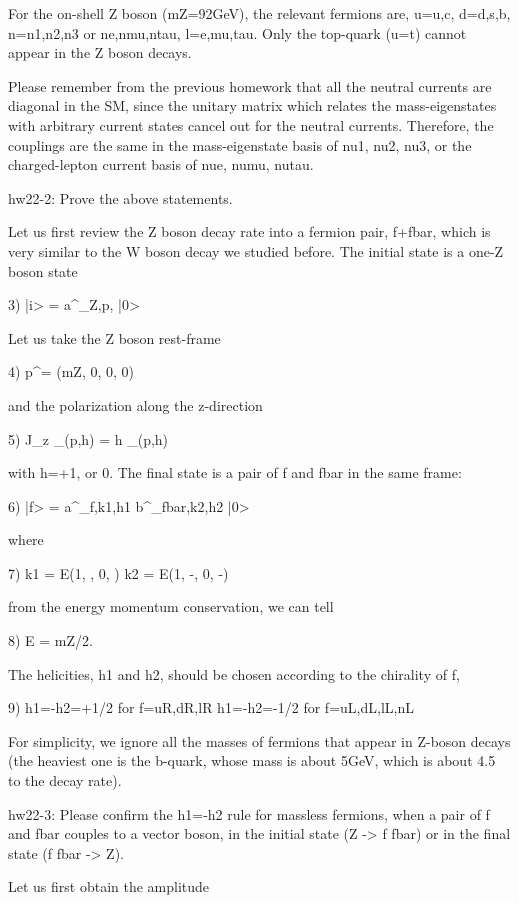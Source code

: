 \documentclass[12pt]{article}
\begin{document}
For the on-shell Z boson (mZ=92GeV), the relevant fermions are,
u=u,c, d=d,s,b, n=n1,n2,n3 or ne,nmu,ntau, l=e,mu,tau.
Only the top-quark (u=t) cannot appear in the Z boson decays.

Please remember from the previous homework that all the neutral
currents are diagonal in the SM, since the unitary matrix which
relates the mass-eigenstates with arbitrary current states
cancel out for the neutral currents.  Therefore, the couplings
are the same in the mass-eigenstate basis of nu1, nu2, nu3,
or the charged-lepton current basis of nue, numu, nutau.

hw22-2: Prove the above statements.

Let us first review the Z boson decay rate into a fermion pair, f+fbar,
which is very similar to the W boson decay we studied before.  The
initial state is a one-Z boson state

3) |i> = a^\dagger_{Z,p,\lambda} |0>

Let us take the Z boson rest-frame

4) p^\mu = (mZ, 0, 0, 0)

and the polarization along the z-direction

5) J_z \epsilon_\mu(p,h) = h \epsilon_\mu(p,h)

with h=+1, or 0.  The final state is a pair of f and fbar in the same
frame:

6) |f> = a^\dagger_{f,k1,h1} b^\dagger_{fbar,k2,h2} |0>

where

7) k1 = E(1,  \sin\theta, 0,  \cos\theta)
   k2 = E(1, -\sin\theta, 0, -\cos\theta)

from the energy momentum conservation, we can tell

8) E = mZ/2.

The helicities, h1 and h2, should be chosen according to the chirality
of f,

9) h1=-h2=+1/2 for f=uR,dR,lR
   h1=-h2=-1/2 for f=uL,dL,lL,nL

For simplicity, we ignore all the masses of fermions that appear in
Z-boson decays (the heaviest one is the b-quark, whose mass is about
5GeV, which is about 4.5%
to the decay rate).

hw22-3: Please confirm the h1=-h2 rule for massless fermions, when
a pair of f and fbar couples to a vector boson, in the initial state
(Z -> f fbar) or in the final state (f fbar -> Z).

Let us first obtain the amplitude
\end{document}
